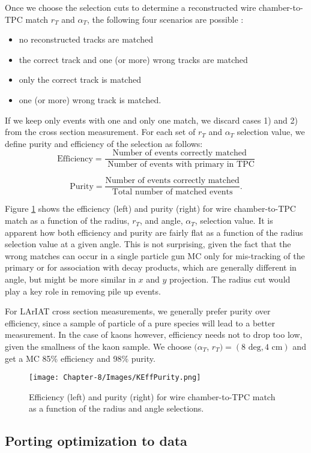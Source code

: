 Once we choose the selection cuts to determine a reconstructed wire chamber-to-TPC match $r_{T}$ and $\alpha_{T}$, the following four scenarios are possible : 
\begin{itemize}
\item[1)] no reconstructed tracks are matched
\item[2)] the correct track and one (or more) wrong tracks are matched
\item[3)] only the correct track is matched
\item[4)] one (or more) wrong track is matched.
\end{itemize}

If we keep only events with one and only one match, we discard cases 1) and 2) from the cross section measurement. For each set of $r_{T}$ and $\alpha_{T}$ selection value, we define purity and efficiency of the selection as follows:
\begin{equation}
\text{Efficiency} = \frac{\text{Number of events correctly matched}}{\text{ Number of events with primary in TPC}}
\end{equation}

\begin{equation}
\text{Purity} = \frac{\text{Number of events correctly matched}}{\text{Total number of matched events}}.
\end{equation}

Figure \ref{fig:EffPurityK} shows the efficiency (left) and purity (right) for wire chamber-to-TPC match as a function of the radius, $r_{T}$, and angle, $\alpha_{T}$, selection value. It is apparent how both efficiency and purity are fairly flat as a function of the radius selection value at a given angle. This is not surprising, given the fact that the wrong matches can occur  in a single particle gun MC  only for mis-tracking of the primary or for association with decay products, which are generally different in angle, but might be more similar in $x$ and $y$ projection. The radius cut would play a key role in removing pile up events. 

For LArIAT cross section measurements, we generally prefer purity over efficiency, since a sample of particle of a pure species will lead to a better measurement. In the case of kaons however, efficiency needs not to drop too low, given the smallness of the kaon sample. We choose $(\alpha_{T}$, $r_{T}) = (8 \text{ deg}, 4 \text{ cm} )$ and get a MC 85\% efficiency and 98\% purity.


\begin{figure}[hpbt]
\centering
\texttt{[image: Chapter-8/Images/KEffPurity.png]}
\caption{Efficiency (left) and purity (right) for wire chamber-to-TPC match as a function of the radius and angle selections.}
\label{fig:EffPurityK}
\end{figure}

\subsection{Porting optimization to data}
